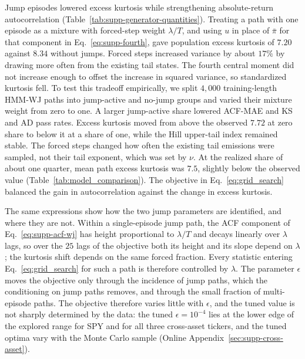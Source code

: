 Jump episodes lowered excess kurtosis while strengthening
absolute-return autocorrelation
(Table~\ref{tab:supp-generator-quantities}). Treating a path with one
episode as a mixture with forced-step weight $\lambda/T$, and using
$u$ in place of $\bar\pi$ for that component in
Eq.~\eqref{eq:supp-fourth}, gave population excess kurtosis of $7.20$
against $8.34$ without jumps. Forced steps increased variance by
about $17\%$ by drawing more often from the existing tail states.
The fourth central moment did not increase enough to offset the
increase in squared variance, so standardized kurtosis fell. To test
this tradeoff empirically, we split $4{,}000$ training-length HMM-WJ
paths into jump-active and no-jump groups and varied their mixture
weight from zero to one. A larger jump-active share lowered ACF-MAE
and KS and AD pass rates. Excess kurtosis moved from above the
observed $7.72$ at zero share to below it at a share of one, while
the Hill upper-tail index remained stable. The forced steps changed
how often the existing tail emissions were sampled, not their tail
exponent, which was set by $\nu$. At the realized share of about one
quarter, mean path excess kurtosis was $7.5$, slightly below the
observed value (Table~\ref{tab:model_comparison}). The objective in
Eq.~\eqref{eq:grid_search} balanced the gain in autocorrelation
against the change in excess kurtosis.

The same expressions show how the two jump parameters are identified,
and where they are not. Within a single-episode jump path, the ACF
component of Eq.~\eqref{eq:supp-acf-wj} has height proportional to
$\lambda / T$ and decays linearly over $\lambda$ lags, so over the
$25$ lags of the objective both its height and its slope depend on
$\lambda$; the kurtosis shift depends on the same forced fraction.
Every statistic entering Eq.~\eqref{eq:grid_search} for such a path
is therefore controlled by $\lambda$. The parameter $\epsilon$ moves
the objective only through the incidence of jump paths, which the
conditioning on jump paths removes, and through the small fraction of
multi-episode paths. The objective therefore varies little with
$\epsilon$, and the tuned value is not sharply determined by the
data: the tuned $\epsilon = 10^{-4}$ lies at the lower edge of the
explored range for SPY and for all three cross-asset tickers, and the
tuned optima vary with the Monte Carlo sample (Online
Appendix~\ref{sec:supp-cross-asset}).


